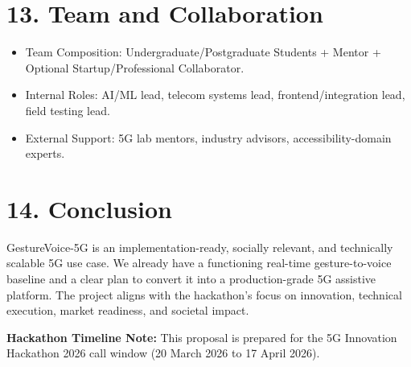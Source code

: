 \documentclass[11pt,a4paper]{article}
\begin{document}
\section*{13. Team and Collaboration}
\begin{itemize}
    \item Team Composition: Undergraduate/Postgraduate Students + Mentor + Optional Startup/Professional Collaborator.
    \item Internal Roles: AI/ML lead, telecom systems lead, frontend/integration lead, field testing lead.
    \item External Support: 5G lab mentors, industry advisors, accessibility-domain experts.
\end{itemize}

\section*{14. Conclusion}
GestureVoice-5G is an implementation-ready, socially relevant, and technically scalable 5G use case. We already have a functioning real-time gesture-to-voice baseline and a clear plan to convert it into a production-grade 5G assistive platform. The project aligns with the hackathon's focus on innovation, technical execution, market readiness, and societal impact.

\vspace{1em}
\noindent\textbf{Hackathon Timeline Note:} This proposal is prepared for the 5G Innovation Hackathon 2026 call window (20 March 2026 to 17 April 2026).
\end{document}

